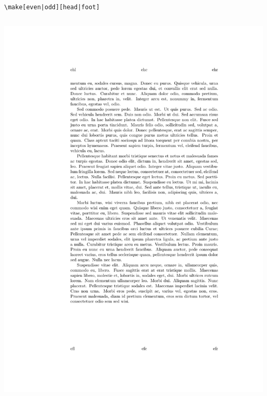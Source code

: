 \documentclass{beamer}
\begin{document}
\begin{frame}[fragile]{\texttt{\textbackslash make[even|odd][head|foot]}}
\begin{columns}
\begin{column}{0.4\textwidth}
\begin{overprint}
        \includegraphics[frame,width=\linewidth]{demo-hf-2}
      \end{overprint}
    \end{column}
  \end{columns}
\end{frame}
\end{document}
